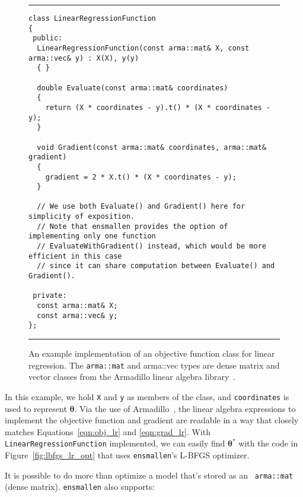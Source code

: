 \begin{figure}[t!]
\hrule
\vspace{1ex}
\begin{verbatim}
class LinearRegressionFunction
{
 public:
  LinearRegressionFunction(const arma::mat& X, const arma::vec& y) : X(X), y(y)
  { }

  double Evaluate(const arma::mat& coordinates)
  {
    return (X * coordinates - y).t() * (X * coordinates - y);
  }

  void Gradient(const arma::mat& coordinates, arma::mat& gradient)
  {
    gradient = 2 * X.t() * (X * coordinates - y);
  }

  // We use both Evaluate() and Gradient() here for simplicity of exposition.
  // Note that ensmallen provides the option of implementing only one function
  // EvaluateWithGradient() instead, which would be more efficient in this case
  // since it can share computation between Evaluate() and Gradient().

 private:
  const arma::mat& X;
  const arma::vec& y;
};
\end{verbatim}
\hrule
\vspace*{-0.5em}
\caption{An example implementation of an objective function class for linear
regression.
The {\tt arma::mat} and {arma::vec} types are 
dense matrix and vector classes
from the Armadillo linear algebra library~\cite{sanderson2016armadillo}.
}
\label{fig:lr_function}
\end{figure}

In this example, we hold {\tt X} and {\tt y} as members of the
class, and {\tt coordinates} is used to represent $\bm \theta$.  Via the
use of Armadillo~\cite{sanderson2016armadillo}, the linear algebra expressions
to implement the objective function and gradient are readable in a way that
closely matches Equations~\ref{eqn:obj_lr} and \ref{eqn:grad_lr}.  With {\tt
LinearRegressionFunction} implemented, we can easily find $\bm \theta^*$
with the code in Figure~\ref{fig:lbfgs_lr_opt} that uses {\tt ensmallen}'s
L-BFGS optimizer.

It is possible to do more than optimize a model that's stored as an {\tt
arma::mat} (dense matrix).  {\tt ensmallen} also supports:

